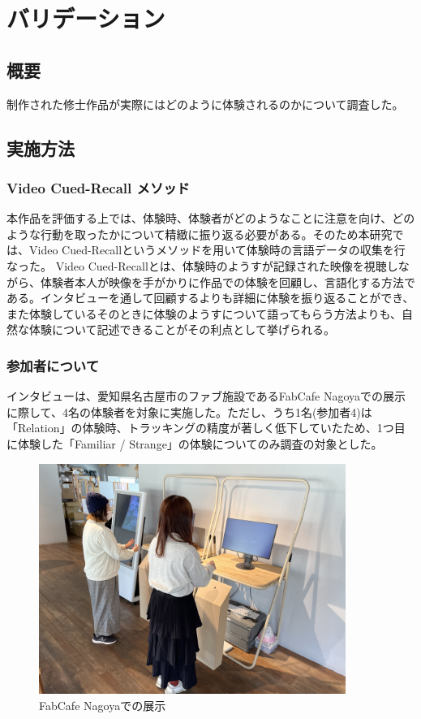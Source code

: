 \chapter{バリデーション}
\label{validation}
\section{概要}
制作された修士作品が実際にはどのように体験されるのかについて調査した。

\section{実施方法}
\subsection{Video Cued-Recall メソッド}
本作品を評価する上では、体験時、体験者がどのようなことに注意を向け、どのような行動を取ったかについて精緻に振り返る必要がある。そのため本研究では、Video Cued-Recallというメソッドを用いて体験時の言語データの収集を行なった。 Video Cued-Recallとは、体験時のようすが記録された映像を視聴しながら、体験者本人が映像を手がかりに作品での体験を回顧し、言語化する方法である\cite{Costello2005}。インタビューを通して回顧するよりも詳細に体験を振り返ることができ、また体験しているそのときに体験のようすについて語ってもらう方法よりも、自然な体験について記述できることがその利点として挙げられる。

\subsection{参加者について}
インタビューは、愛知県名古屋市のファブ施設であるFabCafe Nagoyaでの展示に際して、4名の体験者を対象に実施した。ただし、うち1名(参加者4)は「Relation」の体験時、トラッキングの精度が著しく低下していたため、1つ目に体験した「Familiar / Strange」の体験についてのみ調査の対象とした。

\begin{figure}[H]
  \centering
  \includegraphics[width=10cm]{img/exhibit_at_fabcafe.jpeg}
  \caption{FabCafe Nagoyaでの展示}
  \label{fig:exhibit_at_fabcafe}
\end{figure}

